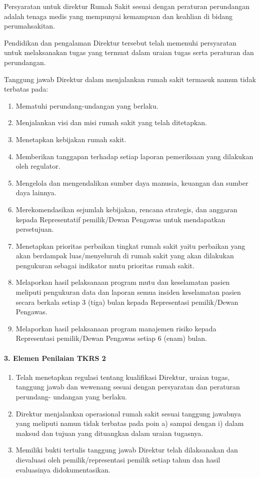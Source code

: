 \documentclass[
]{book}
\providecommand{\tightlist}{%
  \setlength{\itemsep}{0pt}\setlength{\parskip}{0pt}}
\begin{document}
Persyaratan untuk direktur Rumah Sakit sesuai dengan peraturan perundangan adalah tenaga medis yang mempunyai kemampuan dan keahlian di bidang perumahsakitan.

Pendidikan dan pengalaman Direktur tersebut telah memenuhi persyaratan untuk melaksanakan tugas yang termuat dalam uraian tugas serta peraturan dan perundangan.

Tanggung jawab Direktur dalam menjalankan rumah sakit termasuk namun tidak terbatas pada:

\begin{enumerate}
\def\labelenumi{\alph{enumi}.}
\tightlist
\item
  Mematuhi perundang-undangan yang berlaku.
\item
  Menjalankan visi dan misi rumah sakit yang telah ditetapkan.
\item
  Menetapkan kebijakan rumah sakit.
\item
  Memberikan tanggapan terhadap setiap laporan pemeriksaan yang dilakukan oleh regulator.
\item
  Mengelola dan mengendalikan sumber daya manusia, keuangan dan sumber daya lainnya.
\item
  Merekomendasikan sejumlah kebijakan, rencana strategis, dan anggaran kepada Representatif pemilik/Dewan Pengawas untuk mendapatkan persetujuan.
\item
  Menetapkan prioritas perbaikan tingkat rumah sakit yaitu perbaikan yang akan berdampak luas/menyeluruh di rumah sakit yang akan dilakukan pengukuran sebagai indikator mutu prioritas rumah sakit.
\item
  Melaporkan hasil pelaksanaan program mutu dan keselamatan pasien meliputi pengukuran data dan laporan semua insiden keselamatan pasien secara berkala setiap 3 (tiga) bulan kepada Representasi pemilik/Dewan Pengawas.
\item
  Melaporkan hasil pelaksanaan program manajemen risiko kepada Representasi pemilik/Dewan Pengawas setiap 6 (enam) bulan.
\end{enumerate}

\hypertarget{elemen-penilaian-tkrs-2}{%
\paragraph*{3. Elemen Penilaian TKRS 2}\label{elemen-penilaian-tkrs-2}}

\begin{enumerate}
\def\labelenumi{\alph{enumi}.}
\tightlist
\item
  Telah menetapkan regulasi tentang kualifikasi Direktur, uraian tugas, tanggung jawab dan wewenang sesuai dengan persyaratan dan peraturan perundang- undangan yang berlaku.
\item
  Direktur menjalankan operasional rumah sakit sesuai tanggung jawabnya yang meliputi namun tidak terbatas pada poin a) sampai dengan i) dalam maksud dan tujuan yang dituangkan dalam uraian tugasnya.
\item
  Memiliki bukti tertulis tanggung jawab Direktur telah dilaksanakan dan dievaluasi oleh pemilik/representasi pemilik setiap tahun dan hasil evaluasinya didokumentasikan.
\end{enumerate}
\end{document}
